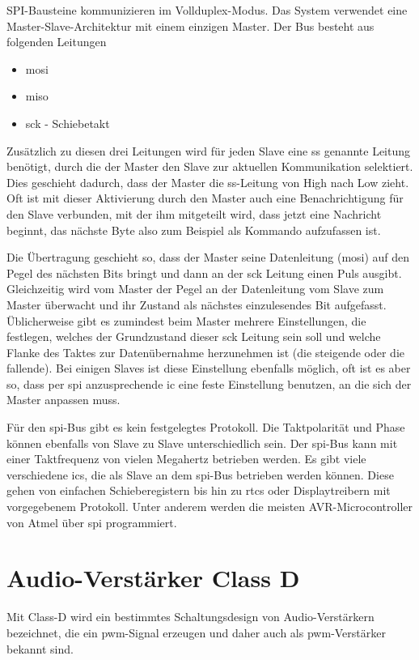 SPI-Bausteine kommunizieren im Vollduplex-Modus.
Das System verwendet eine Master-Slave-Architektur mit einem einzigen Master.
Der Bus besteht aus folgenden Leitungen
\begin{itemize}
	\item \ac{mosi}
	\item \ac{miso}
	\item \ac{sck} - Schiebetakt	
\end{itemize}

Zusätzlich zu diesen drei Leitungen wird für jeden Slave eine \ac{ss} genannte Leitung benötigt, durch die der Master den Slave zur aktuellen Kommunikation selektiert.
Dies geschieht dadurch, dass der Master die \ac{ss}-Leitung von High nach Low zieht.
Oft ist mit dieser Aktivierung durch den Master auch eine Benachrichtigung für den Slave verbunden, mit der ihm mitgeteilt wird, dass jetzt eine Nachricht beginnt, das nächste Byte also zum Beispiel als Kommando aufzufassen ist. \cite{mikrocontroller-spi}\par

Die Übertragung geschieht so, dass der Master seine Datenleitung (\ac{mosi}) auf den Pegel des nächsten Bits bringt und dann an der \ac{sck} Leitung einen Puls ausgibt.
Gleichzeitig wird vom Master der Pegel an der Datenleitung vom Slave zum Master überwacht und ihr Zustand als nächstes einzulesendes Bit aufgefasst.
Üblicherweise gibt es zumindest beim Master mehrere Einstellungen, die festlegen, welches der Grundzustand dieser \ac{sck} Leitung sein soll und welche Flanke des Taktes zur Datenübernahme herzunehmen ist (die steigende oder die fallende).
Bei einigen Slaves ist diese Einstellung ebenfalls möglich, oft ist es aber so, dass per \ac{spi} anzusprechende \ac{ic} eine feste Einstellung benutzen, an die sich der Master anpassen muss. \cite{mikrocontroller-spi}\par

Für den \ac{spi}-Bus gibt es kein festgelegtes Protokoll.
Die Taktpolarität und Phase können ebenfalls von Slave zu Slave unterschiedlich sein.
Der \ac{spi}-Bus kann mit einer Taktfrequenz von vielen Megahertz betrieben werden.
Es gibt viele verschiedene \acp{ic}, die als Slave an dem \ac{spi}-Bus betrieben werden können. Diese gehen von einfachen Schieberegistern bis hin zu \acp{rtc} oder Displaytreibern mit vorgegebenem Protokoll.
Unter anderem werden die meisten AVR-Microcontroller von Atmel über \ac{spi} programmiert. \cite{mikrocontroller-spi}\par

\section{Audio-Verstärker Class D}
Mit Class-D wird ein bestimmtes Schaltungsdesign von Audio-Verstärkern bezeichnet, die ein \ac{pwm}-Signal erzeugen und daher auch als \ac{pwm}-Verstärker bekannt sind. \cite{fairaudio-classd}\par

